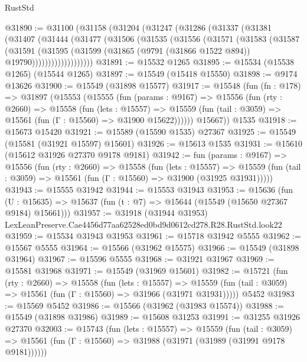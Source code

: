 \begin{lexlean}{RustStd}
\begin{coremodule}
@31890 := @31100
    (@31158
      (@31204
        (@31247
          (@31286
            (@31337
              (@31381
                (@31407
                  (@31444
                    (@31477
                      (@31506
                        (@31535
                          (@31556
                            (@31571
                              (@31583
                                (@31587
                                  (@31591
                                    (@31595
                                      (@31599
                                        (@31865
                                          (@9791 (@31866 @1522 @894))
                                          @19790)))))))))))))))))))
@31891 := @15532 @1265
@31895 := @15534 (@15538 @1265) (@15544 @1265)
@31897 := @15549 (@15418 @15550)
@31898 := @9174 @13626
@31900 := @15549 (@31898 @15577)
@31917 := @15548
    (fun (fn : @178) =>
    @31897
      (@15553
        (@15555
          (fun (params : @9167) =>
          @15556
            (fun (rty : @2660) =>
            @15558
              (fun (lets : @15557) =>
              @15559 (fun (tail : @3059) => @15561 (fun (Γ : @15560) => @31900 @15622))))))
        @15667))
    @1535
@31918 := @15673 @15420
@31921 := @15589 (@15590 @1535) @27367
@31925 := @15549 (@15581 (@31921 @15597) @15601)
@31926 := @15613 @1535
@31931 := @15610 (@15612 @31926 @27370 @9178 @9181)
@31942 := fun (params : @9167) =>
  @15556
    (fun (rty : @2660) =>
    @15558
      (fun (lets : @15557) =>
      @15559 (fun (tail : @3059) => @15561 (fun (Γ : @15560) => @31900 (@31925 @31931)))))
@31943 := @15555 @31942
@31944 := @15553 @31943
@31953 := @15636
    (fun (U : @15635) => @15637 (fun (t : @7) => @15644 (@15549 (@15650 @27367 @9184) @15661)))
@31957 := @31918
    (@31944 @31953)
    LexLeanPreserve.Cae4456d77aa62528ed0bd9d0612cd278.R28.RustStd.look22
@31959 := @15534 @31943 @31953
@31961 := @15718 @31942 @5555
@31962 := @15567 @5555
@31964 := @15566 (@31962 @15575)
@31966 := @15549 (@31898 @31964)
@31967 := @15596 @5555
@31968 := @31921 @31967
@31969 := @15581 @31968
@31971 := @15549 (@31969 @15601)
@31982 := @15721
    (fun (rty : @2660) =>
    @15558
      (fun (lets : @15557) =>
      @15559 (fun (tail : @3059) => @15561 (fun (Γ : @15560) => @31966 (@31971 @31931)))))
    @5452
@31983 := @15569 @5452
@31986 := @15566 (@31962 (@31983 @15574))
@31988 := @15549 (@31898 @31986)
@31989 := @15608 @31253
@31991 := @31255 @31926 @27370
@32003 := @15743
    (fun (lets : @15557) =>
    @15559
      (fun (tail : @3059) =>
      @15561 (fun (Γ : @15560) => @31988 (@31971 (@31989 (@31991 @9178 @9181))))))

\end{coremodule}
\end{lexlean}
